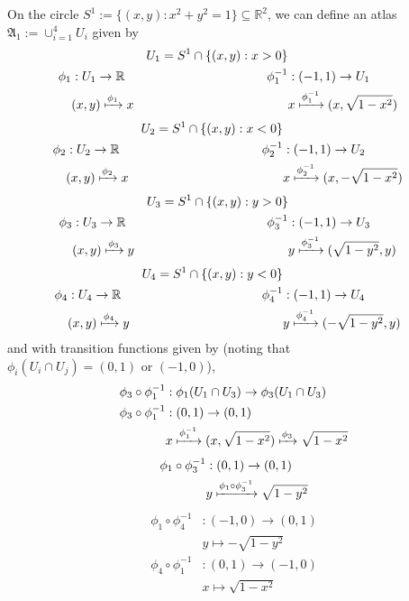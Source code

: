 \documentclass[a4paper]{article}
\theoremstyle{definition} \newtheorem*{definition}{Definition}
\theoremstyle{definition} \newtheorem*{definitions}{Definitions}
\theoremstyle{plain} \newtheorem{theorem}{Theorem}[section]
\theoremstyle{plain} \newtheorem{proposition}[theorem]{Proposition}
\theoremstyle{plain} \newtheorem{corollary}[theorem]{Corollary}
\theoremstyle{plain} \newtheorem{lemma}[theorem]{Lemma}
\theoremstyle{plain} \newtheorem{example}[theorem]{Example}
\newcommand{\realnos}{\mathbb{R}}
\begin{document}
On the circle $S^1:=\{(x, y): x^2+y^2 = 1\}\subseteq \realnos^2$, we can define an atlas $\mathfrak{A}_1 :=\cup_{i=1}^4 U_i$ given by 
\begin{align*}
&& U_1 = S^1 \cap \{(x, y): x>0 \} \\
\phi_1 & : U_1\to \realnos &
\phi_1^{-1} & :(-1, 1)\to U_1 \\
& (x,y) \xmapsto{\phi_1} x 
& & x \xmapsto{\phi_1^{-1}} (x, \sqrt{1-x^2})
\end{align*}
\begin{align*}
&& U_2 = S^1 \cap \{(x, y): x<0 \} \\
\phi_2 & : U_2\to \realnos &
\phi_2^{-1} & :(-1, 1)\to U_2 \\
& (x,y) \xmapsto{\phi_2} x 
& & x \xmapsto{\phi_2^{-1}} (x, - \sqrt{1-x^2})
\end{align*}
\begin{align*}
&& U_3 = S^1 \cap \{(x, y): y>0 \} \\
\phi_3 & : U_3\to \realnos &
\phi_3^{-1} & :(-1, 1)\to U_3 \\
& (x,y) \xmapsto{\phi_3} y
& & y \xmapsto{\phi_3^{-1}} (\sqrt{1-y^2}, y)
\end{align*}
\begin{align*}
&& U_4 = S^1 \cap \{(x, y): y<0 \} \\
\phi_4 & : U_4\to \realnos &
\phi_4^{-1} & :(-1, 1)\to U_4 \\
& (x,y) \xmapsto{\phi_4} y
& & y \xmapsto{\phi_4^{-1}} (- \sqrt{1-y^2}, y)
\end{align*}
and with transition functions given by (noting that $\phi_i(U_i\cap U_j) = (0, 1) \text{ or } (-1, 0)$), 
\begin{align*}
\phi_3 \circ \phi_1^{-1} & :\phi_1(U_1\cap U_3)\to \phi_3(U_1 \cap U_3) \\
\phi_3 \circ \phi_1^{-1} & : (0,1) \to (0,1) \\
& x \xmapsto{\phi_1^{-1}} (x, \sqrt{1-x^2}) \xmapsto{\phi_3} \sqrt{1-x^2}
\end{align*}
\begin{align*}
\phi_1 \circ \phi_3^{-1} & : (0,1) \to (0,1) \\
& y \xmapsto{\phi_1 \circ \phi_3^{-1}}  \sqrt{1-y^2}
\end{align*}
\begin{align*}
\phi_1 \circ \phi_4^{-1} & : (-1,0) \to (0,1) \\
& y \mapsto -\sqrt{1-y^2}
\end{align*}
\begin{align*}
\phi_4 \circ \phi_1^{-1} & : (0,1) \to (-1, 0) \\
& x \mapsto \sqrt{1-x^2}
\end{align*}
\end{document}
